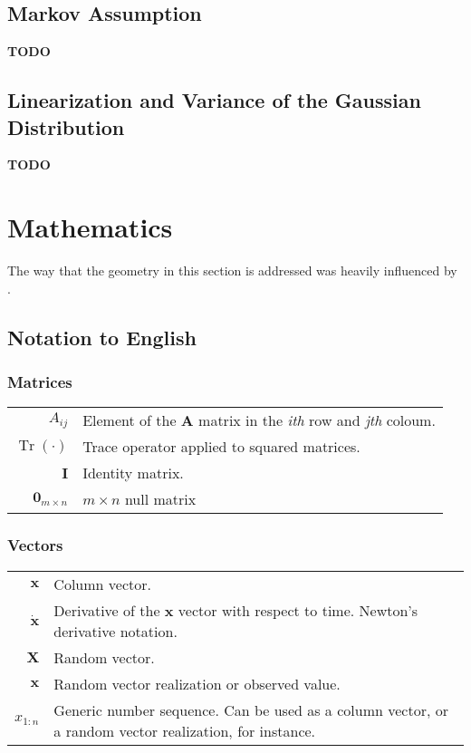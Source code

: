 \documentclass[12pt]{article}
\newcommand{\bvec}[1]{\mathbf{#1}} %
\newcommand{\mat}[1]{\mathbf{#1}}
\newcommand{\parentheses}[1]{\left(#1\right)}
\newcommand{\mb}[1]{{\boldsymbol{#1}}} %
\DeclareMathOperator{\Tr}{Tr}
\begin{document}
\subsection{Markov Assumption}
\color{magenta}
\textbf{TODO}
\color{black}

\subsection{Linearization and Variance of the Gaussian Distribution}
\color{magenta}
\textbf{TODO}
\color{black}

\section{Mathematics}
The way that the geometry in this section is addressed was heavily influenced by \cite{lynch2017modern}.

\subsection{Notation to English}
\subsubsection*{Matrices}
\begin{table}[h]
    \centering
    \begin{tabularx}{\textwidth}{|rX|}
        \hline
         $A_{ij}$ & Element of the $\mat{A}$ matrix in the \textit{ith} row and \textit{jth} coloum. \\
         $\Tr\parentheses{\cdot}$ & Trace operator applied to squared matrices.\\
         $\mat{I}$ & Identity matrix.  \\
         $\mat{0}_{m\times n}$ & $m\times n$ null matrix
         \\ \hline
    \end{tabularx}
    \label{tab:my_label}
\end{table}

\subsubsection*{Vectors}
\begin{table}[h]
    \centering
    \begin{tabularx}{\textwidth}{|rX|}
        \hline
         $\bvec{x}$ & Column vector.\\
         $\bvec{\dot{x}}$ & Derivative of the $\bvec{x}$ vector with respect to time. Newton's derivative notation.\\
         $\mb{X}$ & Random vector. \\
         $\mb{x}$ & Random vector realization or observed value. \\
         $x_{1:n}$ & Generic number sequence. Can be used as a column vector, or a random vector realization, for instance.
         \\ \hline
    \end{tabularx}
\end{table}
\end{document}
